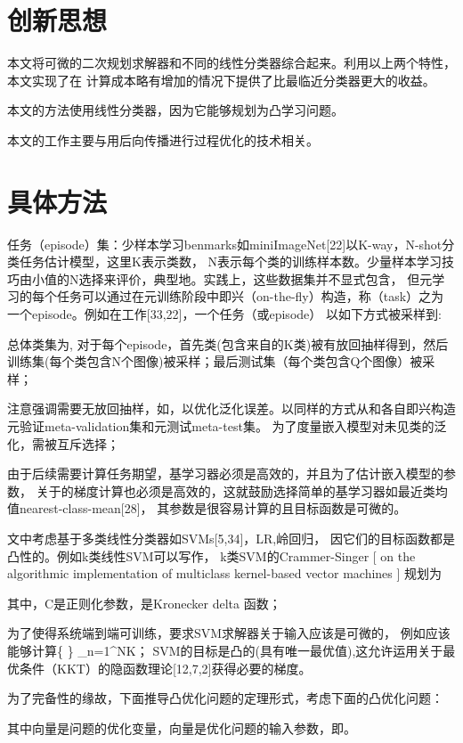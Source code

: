\section{创新思想}
本文将可微的二次规划求解器和不同的线性分类器综合起来。利用以上两个特性，本文实现了在
计算成本略有增加的情况下提供了比最临近分类器更大的收益。

本文的方法使用线性分类器，因为它能够规划为凸学习问题。

本文的工作主要与用后向传播进行过程优化的技术相关。

\section{具体方法}

任务（episode）集：少样本学习benmarks如miniImageNet[22]以K-way，N-shot分类任务估计模型，这里K表示类数，
N表示每个类的训练样本数。少量样本学习技巧由小值的N选择来评价，典型地。实践上，这些数据集并不显式包含，
但元学习的每个任务可以通过在元训练阶段中即兴（on-the-fly）构造，称（task）之为一个episode。例如在工作[33,22]，一个任务（或episode）
以如下方式被采样到:

总体类集为, 对于每个episode，首先类(包含来自的K类)被有放回抽样得到，然后训练集(每个类包含N个图像)被采样；最后测试集（每个类包含Q个图像）被采样；

注意强调需要无放回抽样，如，以优化泛化误差。以同样的方式从和各自即兴构造元验证meta-validation集和元测试meta-test集。
为了度量嵌入模型对未见类的泛化，需被互斥选择；

由于后续需要计算任务期望，基学习器必须是高效的，并且为了估计嵌入模型的参数，
关于的梯度计算也必须是高效的，这就鼓励选择简单的基学习器如最近类均值nearest-class-mean[28]，
其参数是很容易计算的且目标函数是可微的。

文中考虑基于多类线性分类器如SVMs[5,34]，LR,岭回归，
因它们的目标函数都是凸性的。例如k类线性SVM可以写作，
k类SVM的Crammer-Singer [ on the algorithmic implementation of multiclass kernel-based vector machines ] 
规划为

其中，C是正则化参数，是Kronecker delta 函数；


为了使得系统端到端可训练，要求SVM求解器关于输入应该是可微的，
例如应该能够计算\left\{   \right\} _{n=1}^{N\times K}；
SVM的目标是凸的(具有唯一最优值),这允许运用关于最优条件（KKT）的隐函数理论[12,7,2]获得必要的梯度。


为了完备性的缘故，下面推导凸优化问题的定理形式，考虑下面的凸优化问题：

其中向量是问题的优化变量，向量是优化问题的输入参数，即。

